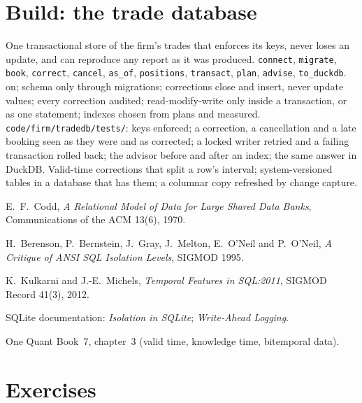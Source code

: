 \section{Build: the trade database}\label{bld:pl:databases-and-sql:tradedb}

\begin{build}
 One transactional store of the firm's trades that enforces its keys, never loses an update, and can reproduce any report as
it was produced.
 \texttt{connect}, \texttt{migrate}, \texttt{book}, \texttt{correct}, \texttt{cancel}, \texttt{as\_of},
\texttt{positions}, \texttt{transact}, \texttt{plan}, \texttt{advise}, \texttt{to\_duckdb}.
  on; schema only through migrations; corrections close and insert, never update values; every correction
audited; read-modify-write only inside a transaction, or as one statement; indexes chosen from plans and measured.
 \texttt{code/firm/tradedb/tests/}: keys enforced; a correction, a cancellation and a late booking seen as they were
and as corrected; a locked writer retried and a failing transaction rolled back; the advisor before and after an index; the same answer in
DuckDB.
 Valid-time corrections that split a row's interval; system-versioned tables in a database that has them; a columnar copy
refreshed by change capture.
\end{build}

\begin{omsources}
\item E.~F.~Codd, \emph{A Relational Model of Data for Large Shared Data Banks}, Communications of the ACM 13(6), 1970.
\item H.~Berenson, P.~Bernstein, J.~Gray, J.~Melton, E.~O'Neil and P.~O'Neil, \emph{A Critique of ANSI SQL Isolation Levels}, SIGMOD 1995.
\item K.~Kulkarni and J.-E.~Michels, \emph{Temporal Features in SQL:2011}, SIGMOD Record 41(3), 2012.
\item SQLite documentation: \emph{Isolation in SQLite}; \emph{Write-Ahead Logging}.
\item One Quant Book~7, chapter~3 (valid time, knowledge time, bitemporal data).
\end{omsources}

\section{Exercises}

